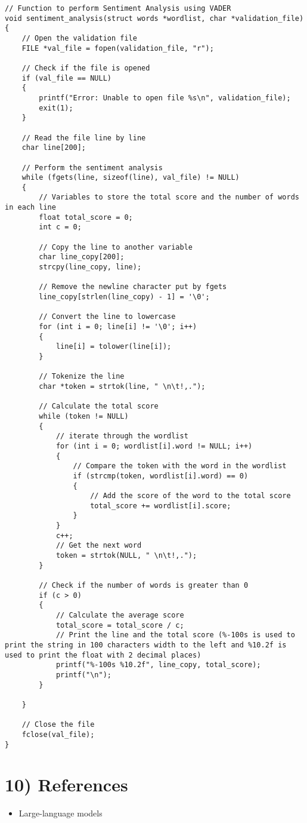 \documentclass[a4paper,11pt]{article}
\theoremstyle{mytheor}
\begin{document}
\begin{lstlisting}[label={list:twelvth},caption=Appendix]
// Function to perform Sentiment Analysis using VADER
void sentiment_analysis(struct words *wordlist, char *validation_file)
{
    // Open the validation file
    FILE *val_file = fopen(validation_file, "r");

    // Check if the file is opened
    if (val_file == NULL)
    {
        printf("Error: Unable to open file %s\n", validation_file);
        exit(1);
    }

    // Read the file line by line
    char line[200];

    // Perform the sentiment analysis
    while (fgets(line, sizeof(line), val_file) != NULL)
    {
        // Variables to store the total score and the number of words in each line
        float total_score = 0;
        int c = 0;
        
        // Copy the line to another variable
        char line_copy[200];
        strcpy(line_copy, line);

        // Remove the newline character put by fgets
        line_copy[strlen(line_copy) - 1] = '\0';

        // Convert the line to lowercase
        for (int i = 0; line[i] != '\0'; i++)
        {
            line[i] = tolower(line[i]);
        }
        
        // Tokenize the line
        char *token = strtok(line, " \n\t!,.");

        // Calculate the total score
        while (token != NULL)
        {
            // iterate through the wordlist
            for (int i = 0; wordlist[i].word != NULL; i++)
            {
                // Compare the token with the word in the wordlist
                if (strcmp(token, wordlist[i].word) == 0)
                {
                    // Add the score of the word to the total score
                    total_score += wordlist[i].score;
                }
            }
            c++;
            // Get the next word
            token = strtok(NULL, " \n\t!,.");
        }
        
        // Check if the number of words is greater than 0
        if (c > 0)
        {
            // Calculate the average score
            total_score = total_score / c;
            // Print the line and the total score (%-100s is used to print the string in 100 characters width to the left and %10.2f is used to print the float with 2 decimal places)
            printf("%-100s %10.2f", line_copy, total_score);
            printf("\n");
        }

    }
    
    // Close the file
    fclose(val_file);
}
\end{lstlisting}



\section*{10) References}

\begin{itemize}
    \item Large-language models 
\end{itemize}
\end{document}
